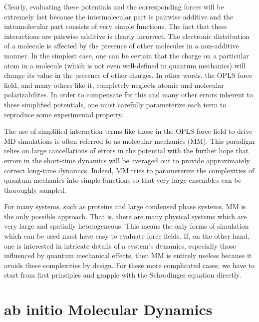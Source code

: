\documentclass[11pt, proquest]{uwthesis}[2020/02/24]
\begin{document}
\par Clearly, evaluating these potentials and the corresponding forces will be extremely fast because the intermolecular part is pairwise additive and the intramolecular part consists of very simple functions. The fact that these interactions are pairwise additive is clearly incorrect. The electronic distribution of a molecule is affected by the presence of other molecules in a non-additive manner\autocite{stone_theory_2013}. In the simplest case, one can be certain that the charge on a particular atom in a molecule (which is not even well-defined in quantum mechanics) will change its value in the presence of other charges. In other words, the OPLS force field, and many others like it, completely neglects atomic and molecular polarizabilites. In order to compensate for this and many other errors inherent to these simplified potentials, one must carefully parameterize each term to reproduce some experimental property.

\par The use of simplified interaction terms like those in the OPLS force field to drive MD simulations is often referred to as molecular mechanics\autocite{rappe_molecular_1997} (MM). This paradigm relies on large cancellations of errors in the potential with the further hope that errors in the short-time dynamics will be averaged out to provide approximately correct long-time dynamics. Indeed, MM tries to parameterize the complexities of quantum mechanics into simple functions so that very large ensembles can be thoroughly sampled.

\par For many systems, such as proteins and large condensed phase systems, MM is the only possible approach. That is, there are many physical systems which are very large and spatially heterogeneous. This means the only forms of simulation which can be used must have easy to evaluate force fields. If, on the other hand, one is interested in intricate details of a system's dynamics, especially those influenced by quantum mechanical effects, then MM is entirely useless because it avoids these complexities by design. For these more complicated cases, we have to start from first principles and grapple with the Schrodinger equation directly.

\section{ab initio Molecular Dynamics}
\end{document}
